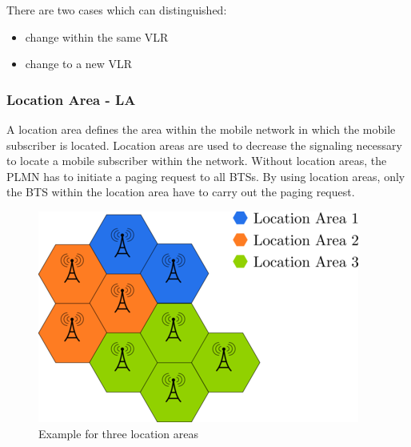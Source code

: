 \documentclass[master,english]{hgbthesis}
\begin{document}
There are two cases which can distinguished:

\begin{itemize}

	\item change within the same VLR

	\item change to a new VLR

\end{itemize}

\subsubsection{Location Area - LA}

A location area defines the area within the mobile network in which the mobile subscriber is located. Location areas are used to decrease the signaling necessary to locate a mobile subscriber within the network. Without location areas, the PLMN has to initiate a paging request to all BTSs. By using location areas, only the BTS within the location area have to carry out the paging request.




% 




\begin{figure}

	\centering

	\includegraphics[width=0.7\linewidth]{./images/locationarea.png}

	\caption{Example for three location areas} 

	\label{fig:locationarea}

\end{figure}
\end{document}
